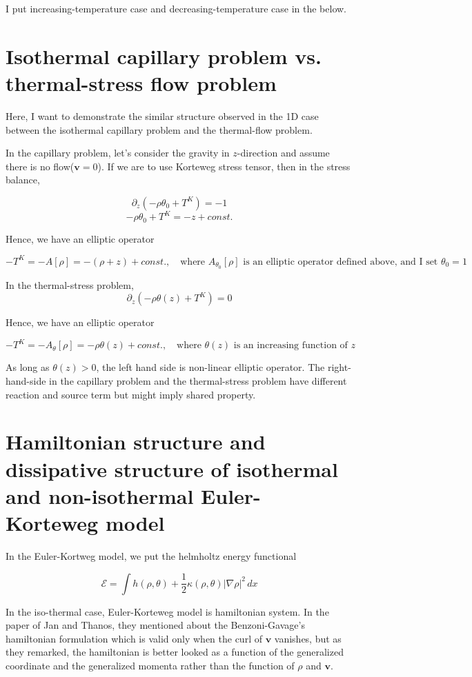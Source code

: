 \documentclass[a4paper,12pt]{article}
\begin{document}
I put increasing-temperature case and decreasing-temperature case in the below.


\section{Isothermal capillary problem vs. thermal-stress flow problem}
Here, I want to demonstrate the similar structure observed in the 1D case between the isothermal capillary problem and the thermal-flow problem.

In the capillary problem, let's consider the gravity in $z$-direction and assume there is no flow($\mathbf{v}=0$). If we are to use Korteweg stress tensor, then in the stress balance,

{{{$$\partial_z(-\rho\theta_0 + T^K) = -1$$}}} {{{$$-\rho\theta_0 + T^K = -z + const.$$}}}

Hence, we have an elliptic operator

{{{$$-T^K = -A[\rho] = -(\rho +z) + const., \quad \text{where $A_{\theta_0}[\rho]$ is an elliptic operator defined above, and I set $\theta_0=1$} $$}}}

In the thermal-stress problem, {{{$$\partial_z(-\rho\theta(z) + T^K) = 0$$}}}

Hence, we have an elliptic operator

{{{$$-T^K = -A_\theta[\rho] = -\rho\theta(z) + const., \quad \text{where $\theta(z)$ is an increasing function of $z$} $$}}}

As long as $\theta(z)>0$, the left hand side is non-linear elliptic operator. The right-hand-side in the capillary problem and the thermal-stress problem have different reaction and source term but might imply shared property.

\section{Hamiltonian structure and dissipative structure of isothermal and non-isothermal Euler-Korteweg model}
In the Euler-Kortweg model, we put the helmholtz energy functional

{{{ $$ \mathcal{E} = \int h(\rho,\theta) + \frac{1}{2}\kappa(\rho,\theta) |\nabla\rho|^2 \, dx $$ }}}

In the iso-thermal case, Euler-Korteweg model is hamiltonian system. In the paper of Jan and Thanos, they mentioned about the Benzoni-Gavage's hamiltonian formulation which is valid only when the curl of $\mathbf{v}$ vanishes, but as they remarked, the hamiltonian is better looked as a function of the generalized coordinate and the generalized momenta rather than the function of $\rho$ and $\mathbf{v}$.
\end{document}
